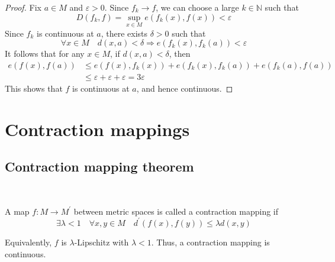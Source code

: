 \documentclass[a4paper]{article}
\begin{document}
\begin{proof}
    Fix $a \in M$ and $\varepsilon>0$. Since $f_k \rightarrow f$, we can choose a large $k \in \mathbb{N}$ such that
    \[
    D\left(f_k, f\right)=\sup _{x \in M} e\left(f_k(x), f(x)\right)<\varepsilon
    \]
    Since $f_k$ is continuous at $a$, there exists $\delta>0$ such that
    \[
    \forall x \in M \quad d(x, a)<\delta \Longrightarrow e\left(f_k(x), f_k(a)\right)<\varepsilon
    \]
    It follows that for any $x \in M$, if $d(x, a)<\delta$, then
    \[
    \begin{aligned}
    e(f(x), f(a)) & \leqslant e\left(f(x), f_k(x)\right)+e\left(f_k(x), f_k(a)\right)+e\left(f_k(a), f(a)\right) \\
    & \leqslant \varepsilon+\varepsilon+\varepsilon=3 \varepsilon
    \end{aligned}
    \]
    This shows that $f$ is continuous at $a$, and hence continuous.
\end{proof}

\section{Contraction mappings}
\subsection{Contraction mapping theorem}\ \vspace{-1.5em}
\begin{definition}
    A map $f: M \rightarrow M^{\prime}$ between metric spaces is called a contraction mapping if
\[
\exists \lambda<1 \quad \forall x, y \in M \quad d^{\prime}(f(x), f(y)) \leqslant \lambda d(x, y)
\]
\end{definition}
\begin{note}
    Equivalently, $f$ is $\lambda$-Lipschitz with $\lambda<1$. Thus, a contraction mapping is continuous.
\end{note}
\end{document}
